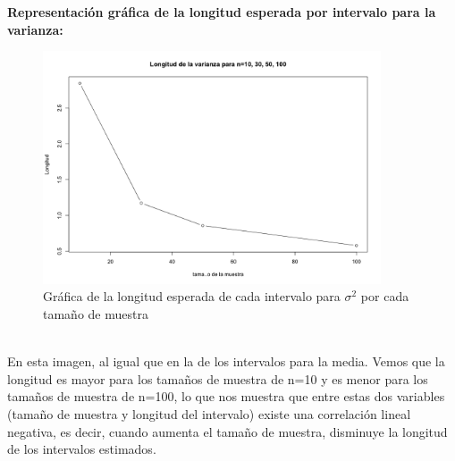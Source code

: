 \documentclass[letterpaper,12pt,onecolumn,titlepage]{article}
\begin{document}
\pagebreak\textbf{Representaci\'{o}n gr\'{a}fica de la longitud esperada por intervalo para la varianza:}
~\\ \begin{figure}[!h]
    \begin{center}
        \includegraphics[width=10cm]{Figuras/Pb2.png}
        \caption{Gr\'{a}fica de la longitud esperada de cada intervalo para $\sigma^2$ por cada tama\~{n}o de muestra}
        \label{fig:Densidad}
    \end{center}
\end{figure}
~\\ En esta imagen, al igual que en la de los intervalos para la media. Vemos que la longitud es mayor para los tama\~{n}os de muestra de n=10 y es menor para los tama\~{n}os de muestra de n=100, lo que nos muestra que entre estas dos variables (tama\~{n}o de muestra y longitud del intervalo) existe una correlaci\'{o}n lineal negativa, es decir, cuando aumenta el tama\~{n}o de muestra, disminuye la longitud de los intervalos estimados.
\end{document}
